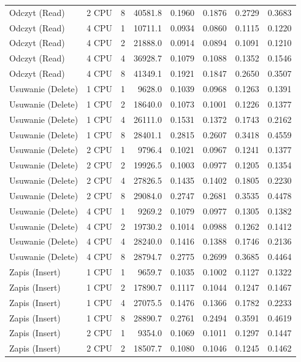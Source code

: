 \begin{table}[ht]
{\begin{tabular}{llcrrrrr}
Odczyt (Read) & 2 CPU & 8 & 40581.8 & 0.1960 & 0.1876 & 0.2729 & 0.3683 \\
Odczyt (Read) & 4 CPU & 1 & 10711.1 & 0.0934 & 0.0860 & 0.1115 & 0.1220 \\
Odczyt (Read) & 4 CPU & 2 & 21888.0 & 0.0914 & 0.0894 & 0.1091 & 0.1210 \\
Odczyt (Read) & 4 CPU & 4 & 36928.7 & 0.1079 & 0.1088 & 0.1352 & 0.1546 \\
Odczyt (Read) & 4 CPU & 8 & 41349.1 & 0.1921 & 0.1847 & 0.2650 & 0.3507 \\
Usuwanie (Delete) & 1 CPU & 1 & 9628.0 & 0.1039 & 0.0968 & 0.1263 & 0.1391 \\
Usuwanie (Delete) & 1 CPU & 2 & 18640.0 & 0.1073 & 0.1001 & 0.1226 & 0.1377 \\
Usuwanie (Delete) & 1 CPU & 4 & 26111.0 & 0.1531 & 0.1372 & 0.1743 & 0.2162 \\
Usuwanie (Delete) & 1 CPU & 8 & 28401.1 & 0.2815 & 0.2607 & 0.3418 & 0.4559 \\
Usuwanie (Delete) & 2 CPU & 1 & 9796.4 & 0.1021 & 0.0967 & 0.1241 & 0.1377 \\
Usuwanie (Delete) & 2 CPU & 2 & 19926.5 & 0.1003 & 0.0977 & 0.1205 & 0.1354 \\
Usuwanie (Delete) & 2 CPU & 4 & 27826.5 & 0.1435 & 0.1402 & 0.1805 & 0.2230 \\
Usuwanie (Delete) & 2 CPU & 8 & 29084.0 & 0.2747 & 0.2681 & 0.3535 & 0.4478 \\
Usuwanie (Delete) & 4 CPU & 1 & 9269.2 & 0.1079 & 0.0977 & 0.1305 & 0.1382 \\
Usuwanie (Delete) & 4 CPU & 2 & 19730.2 & 0.1014 & 0.0988 & 0.1262 & 0.1412 \\
Usuwanie (Delete) & 4 CPU & 4 & 28240.0 & 0.1416 & 0.1388 & 0.1746 & 0.2136 \\
Usuwanie (Delete) & 4 CPU & 8 & 28794.7 & 0.2775 & 0.2699 & 0.3685 & 0.4464 \\
Zapis (Insert) & 1 CPU & 1 & 9659.7 & 0.1035 & 0.1002 & 0.1127 & 0.1322 \\
Zapis (Insert) & 1 CPU & 2 & 17890.7 & 0.1117 & 0.1044 & 0.1247 & 0.1467 \\
Zapis (Insert) & 1 CPU & 4 & 27075.5 & 0.1476 & 0.1366 & 0.1782 & 0.2233 \\
Zapis (Insert) & 1 CPU & 8 & 28890.7 & 0.2761 & 0.2494 & 0.3591 & 0.4619 \\
Zapis (Insert) & 2 CPU & 1 & 9354.0 & 0.1069 & 0.1011 & 0.1297 & 0.1447 \\
Zapis (Insert) & 2 CPU & 2 & 18507.7 & 0.1080 & 0.1046 & 0.1245 & 0.1462 \\

\end{tabular}}
\end{table}

